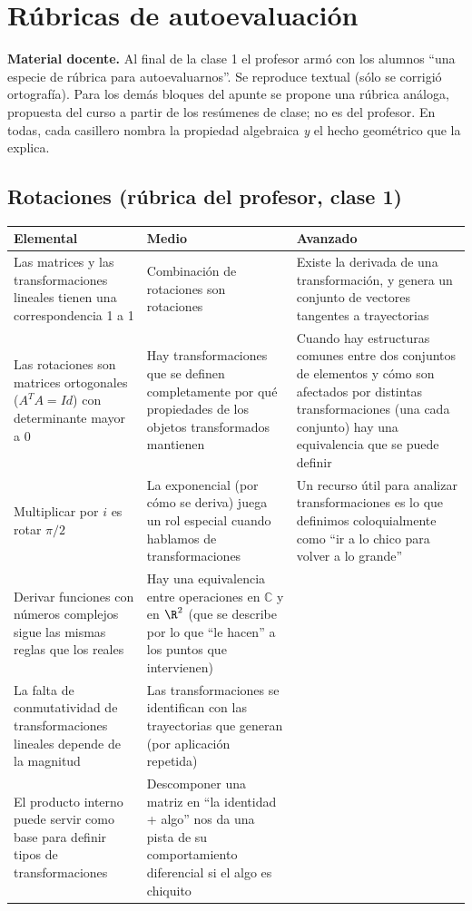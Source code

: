 \section{Rúbricas de autoevaluación}\label{cap:19}\label{ap:rubricas}

\textbf{Material docente.} Al final de la clase 1 el profesor armó con los alumnos ``una
especie de rúbrica para autoevaluarnos''. Se reproduce textual (sólo se corrigió
ortografía). Para los demás bloques del apunte se propone una rúbrica análoga, propuesta
del curso a partir de los resúmenes de clase; no es del profesor. En todas, cada
casillero nombra la propiedad algebraica \emph{y} el hecho geométrico que la explica.

\subsection{Rotaciones (rúbrica del profesor, clase 1)}

{\small
\begin{tabularx}{\textwidth}{YYY}
\toprule
\textbf{Elemental} & \textbf{Medio} & \textbf{Avanzado}\\
\midrule
Las matrices y las transformaciones lineales tienen una correspondencia 1 a 1 &
Combinación de rotaciones son rotaciones &
Existe la derivada de una transformación, y genera un conjunto de vectores tangentes a
trayectorias\\
\addlinespace
Las rotaciones son matrices ortogonales (\(A^{T}A=Id\)) con determinante mayor a 0 &
Hay transformaciones que se definen completamente por qué propiedades de los objetos
transformados mantienen &
Cuando hay estructuras comunes entre dos conjuntos de elementos y cómo son afectados por
distintas transformaciones (una cada conjunto) hay una equivalencia que se puede definir\\
\addlinespace
Multiplicar por \(i\) es rotar \(\pi/2\) &
La exponencial (por cómo se deriva) juega un rol especial cuando hablamos de
transformaciones &
Un recurso útil para analizar transformaciones es lo que definimos coloquialmente como
``ir a lo chico para volver a lo grande''\\
\addlinespace
Derivar funciones con números complejos sigue las mismas reglas que los reales &
Hay una equivalencia entre operaciones en \(\mathbb{C}\) y en \(\R^2\) (que se describe
por lo que ``le hacen'' a los puntos que intervienen) & \\
\addlinespace
La falta de conmutatividad de transformaciones lineales depende de la magnitud &
Las transformaciones se identifican con las trayectorias que generan (por aplicación
repetida) & \\
\addlinespace
El producto interno puede servir como base para definir tipos de transformaciones &
Descomponer una matriz en ``la identidad + algo'' nos da una pista de su comportamiento
diferencial si el algo es chiquito & \\
\bottomrule
\end{tabularx}
}

